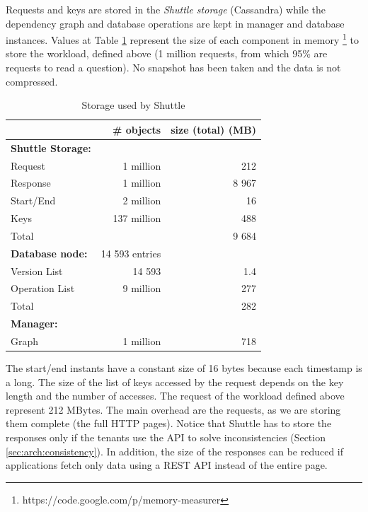 Requests and keys are stored in the \emph{Shuttle storage} (Cassandra) while the dependency graph and database operations are kept in  manager and database instances. Values at Table \ref{tab:storage_overhead} represent the size of each component in memory \footnote{https://code.google.com/p/memory-measurer} to store the workload, defined above (1 million requests, from which 95\% are requests to read a question). No snapshot has been taken and the data is not compressed.

\begin{table}[ht]
\centering
  \begin{tabular}{l|rr}   
              & \textbf{\# objects}   & \textbf{size (total) (MB)} \\ \hline
  \textbf{Shuttle Storage: }             \\
  Request     & 1 million    & 212       \\  %
  Response    & 1 million    & 8 967     \\  %
  Start/End   & 2 million    & 16        \\  %
  Keys        & 137 million  & 488       \\  %
  Total       &              & 9 684     \\  %
  \textbf{Database node:} & 14 593 entries \\ 
  Version   List &  14 593    &  1.4       \\ %
  Operation List &  9 million &  277       \\ %
  Total       &               & 282 \\ %
  \textbf{Manager:} & & \\ 
  Graph       & 1 million     & 718 \\  %
  \end{tabular}            
\caption{Storage used by Shuttle}
\label{tab:storage_overhead}
\end{table}


The start/end instants have a constant size of 16 bytes because each timestamp is a long. The size of the list of keys accessed by the request depends on the key length and the number of accesses. The request of the workload defined above represent 212 MBytes. The main overhead are the requests, as we are storing them complete (the full \ac{HTTP} pages). Notice that Shuttle has to store the responses only if the tenants use the \ac{API} to solve inconsistencies (Section \ref{sec:arch:consistency}). In addition, the size of the responses can be reduced if applications fetch only data using a \ac{REST} \ac{API} instead of the entire page.

